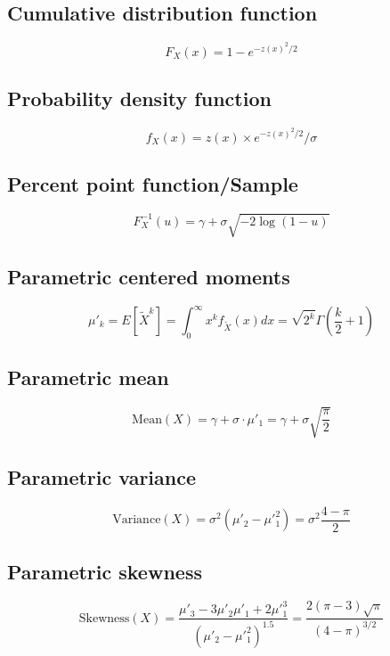 \documentclass{article}
\begin{document}
\subsection{Cumulative distribution function}
\begin{equation*} F_{X}\left(x\right)=1-e^{-z(x)^{2}/2} \end{equation*}
\subsection{Probability density function}
\begin{equation*} f_{X}\left(x\right)=z(x)\times e^{-z(x)^{2}/2}/\sigma \end{equation*}
\subsection{Percent point function/Sample}
\begin{equation*} F^{-1}_{X}\left(u\right)=\gamma+\sigma\sqrt{-2\log\left(1-u\right)} \end{equation*}
\subsection{Parametric centered moments}
\begin{equation*} \mu'_{k}=E[\tilde{X}^k]=\int_{0}^{\infty}x^{k}f_{\tilde{X}}\left(x\right)dx=\sqrt{2^{k}}\Gamma\left(\frac{k}{2}+1\right) \end{equation*}
\subsection{Parametric mean}
\begin{equation*} \mathrm{Mean}(X)=\gamma+\sigma\cdot\mu'_{1}=\gamma+\sigma\sqrt{\frac{\pi}{2}} \end{equation*}
\subsection{Parametric variance}
\begin{equation*} \mathrm{Variance}(X)=\sigma^{2}(\mu'_{2}-\mu'^{2}_{1})=\sigma^{2}\frac{4-\pi}{2} \end{equation*}
\subsection{Parametric skewness}
\begin{equation*} \mathrm{Skewness}(X)=\frac{\mu'_{3}-3\mu'_{2}\mu'_{1}+2\mu'^{3}_{1}}{(\mu'_{2}-\mu'^{2}_{1})^{1.5}}=\frac{2\left(\pi-3\right)\sqrt{\pi}}{\left(4-\pi\right)^{3/2}} \end{equation*}
\end{document}
